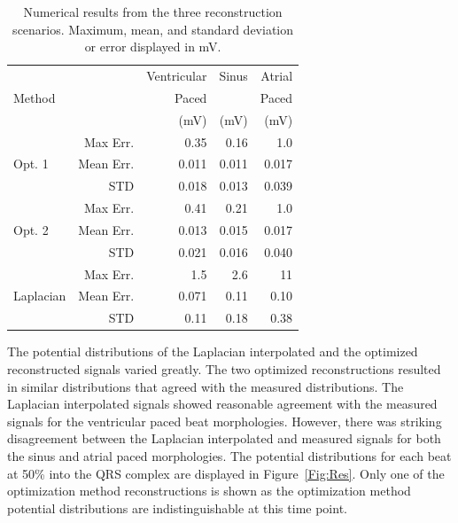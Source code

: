 \documentclass[12pt]{article}
\newcommand{\rpm}{\raisebox{.2ex}{$\scriptstyle\pm$}}
\begin{document}
\begin{table}[htbp]
	\centering
	\caption{\label{tab:err} Numerical results from the three reconstruction scenarios. Maximum, mean, and standard deviation or error displayed in mV.}
	\begin{tabular}{|lr|r|r|r|} \hline
		&&Ventricular&Sinus&Atrial\\
		Method&&Paced&&Paced\\
		&&(mV)&(mV)&(mV)\\
		\hline
		\multirow{3}{*}{Opt. 1}
		&Max Err.&0.35&0.16&1.0\\
		&Mean Err.&0.011&0.011&0.017\\
		&STD&\rpm{}0.018&\rpm{}0.013&\rpm{}0.039\\
		\hline
		\multirow{3}{*}{Opt. 2}
		&Max Err.&0.41&0.21&1.0\\
		&Mean Err.&0.013&0.015&0.017\\
		&STD&\rpm{}0.021&\rpm{}0.016&\rpm{}0.040\\
		\hline
		\multirow{3}{*}{Laplacian}
		&Max Err.&1.5&2.6&11\\
		&Mean Err.&0.071&0.11&0.10\\
		&STD&\rpm{}0.11&\rpm{}0.18&\rpm{}0.38\\
		\hline
		
	\end{tabular}
\end{table}

The potential distributions of the Laplacian interpolated and the optimized
reconstructed signals varied greatly. The two optimized reconstructions
resulted in similar distributions that agreed with the measured
distributions. The Laplacian interpolated signals showed reasonable
agreement with the measured signals for the ventricular paced beat
morphologies. However, there was striking disagreement between the
Laplacian interpolated and measured signals for both the sinus and atrial
paced morphologies. The potential distributions for each beat
at 50\% into the QRS complex are displayed in Figure~\ref{Fig:Res}. Only one of the optimization method reconstructions is shown as the optimization method potential distributions are indistinguishable at this time point.
\end{document}
